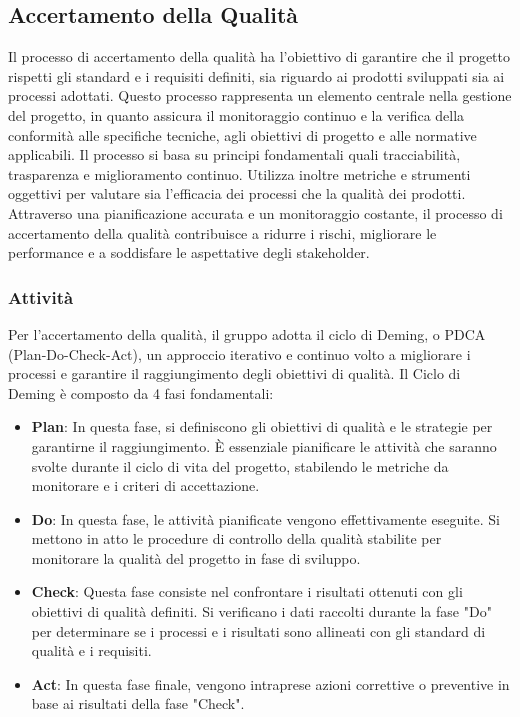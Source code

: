 \subsection{Accertamento della Qualità}
\label{subsec:accertamento_qualità}
Il processo di accertamento della qualità ha l'obiettivo di garantire che il progetto rispetti gli standard e i requisiti definiti, sia riguardo ai prodotti sviluppati sia ai processi adottati. 
Questo processo rappresenta un elemento centrale nella gestione del progetto, in quanto assicura il monitoraggio continuo e la verifica della conformità alle specifiche tecniche, agli obiettivi di progetto e alle normative applicabili.
Il processo si basa su principi fondamentali quali tracciabilità, trasparenza e miglioramento continuo.
Utilizza inoltre metriche e strumenti oggettivi per valutare sia l'efficacia dei processi che la qualità dei prodotti.
Attraverso una pianificazione accurata e un monitoraggio costante, il processo di accertamento della qualità contribuisce a ridurre i rischi, migliorare le performance e a soddisfare le aspettative degli stakeholder.
\subsubsection{Attività}
Per l'accertamento della qualità, il gruppo adotta il ciclo di Deming, o PDCA (Plan-Do-Check-Act), un approccio iterativo e continuo volto a migliorare i processi e garantire il raggiungimento degli obiettivi di qualità.
Il Ciclo di Deming è composto da 4 fasi fondamentali:
\begin{itemize}
    \item \textbf{Plan}: In questa fase, si definiscono gli obiettivi di qualità e le strategie per garantirne il raggiungimento.
    È essenziale pianificare le attività che saranno svolte durante il ciclo di vita del progetto, stabilendo le metriche da monitorare e i criteri di accettazione.
    \item \textbf{Do}: In questa fase, le attività pianificate vengono effettivamente eseguite.
    Si mettono in atto le procedure di controllo della qualità stabilite per monitorare la qualità del progetto in fase di sviluppo.
    \item \textbf{Check}: Questa fase consiste nel confrontare i risultati ottenuti con gli obiettivi di qualità definiti.
    Si verificano i dati raccolti durante la fase "Do" per determinare se i processi e i risultati sono allineati con gli standard di qualità e i requisiti.
    \item \textbf{Act}: In questa fase finale, vengono intraprese azioni correttive o preventive in base ai risultati della fase "Check".
\end{itemize}
